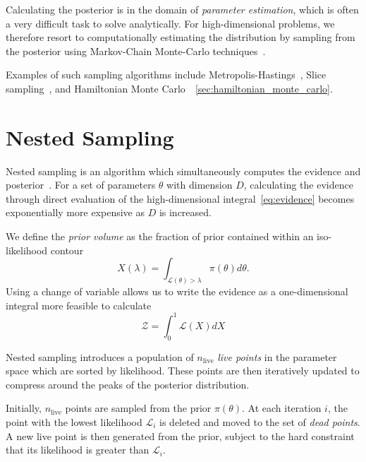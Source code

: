 \documentclass[11pt]{article}
\begin{document}
    Calculating the posterior is in the domain of \emph{parameter estimation}, which is often a very difficult task
    to solve analytically.
    For high-dimensional problems, we therefore resort to computationally estimating the distribution by sampling
    from the posterior using Markov-Chain Monte-Carlo techniques~\cite{gupta2014comparison, delmoral2013mean}.

    Examples of such sampling algorithms include Metropolis-Hastings~\cite{Metropolis_OG},
    Slice sampling~\cite{neal2003slice}, and Hamiltonian Monte Carlo~\cite{HMC_Duane, neal1996monte}~\ref{sec:hamiltonian_monte_carlo}.

    \section{Nested Sampling}\label{sec:nested_sampling}
    Nested sampling is an algorithm which simultaneously computes
    the evidence and posterior~\cite{Skilling2006, Handley_polychord, NS_Review_2022}.
    For a set of parameters $\theta$ with dimension $D$, calculating the evidence through direct evaluation of the
    high-dimensional integral~\ref{eq:evidence} becomes exponentially more expensive as $D$ is increased.

    We define the \emph{prior volume} as the fraction of prior contained within an iso-likelihood contour
    \begin{equation}\label{eq:prior_volume}
        X(\lambda) = \int_{\mathcal{L}(\theta)>\lambda} \pi(\theta) d\theta.
    \end{equation}
    Using a change of variable allows us to write the evidence as a one-dimensional integral more feasible to calculate
    \begin{equation}\label{eq:evidence_ns}
        \mathcal{Z} = \int_0^1 {\mathcal{L}(X)} dX
    \end{equation}

    Nested sampling introduces a population of $n_{\text{live}}$ \emph{live points} in the parameter space which are sorted
    by likelihood.
    These points are then iteratively updated to compress around the peaks of the posterior distribution.

    Initially, $n_{\text{live}}$ points are sampled from the prior $\pi(\theta)$.
    At each iteration $i$, the point with the lowest likelihood $\mathcal{L}_i$ is deleted and moved to the set
    of \emph{dead points}.
    A new live point is then generated from the prior, subject to the hard constraint that its likelihood is
    greater than $\mathcal{L}_i$.
\end{document}
